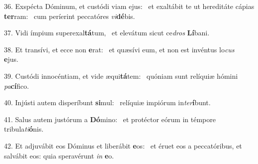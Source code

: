 36. Exspécta Dóminum, et custódi viam ejus: \dag\  et exaltábit te ut hereditáte cápias \textbf{ter}ram: \ast\  cum períerint peccatóres \textit{vi}\textbf{dé}bis.\

37. Vidi ímpium superexal\textbf{tá}tum, \ast\  et elevátum sicut ce\textit{dros} \textbf{Lí}bani.\

38. Et transívi, et ecce non \textbf{e}rat: \ast\  et quæsívi eum, et non est invéntus lo\textit{cus} \textbf{e}jus.\

39. Custódi innocéntiam, et vide æqui\textbf{tá}tem: \ast\  quóniam sunt relíquiæ hómini \textit{pa}\textbf{cí}fico.\

40. Injústi autem disperíbunt \textbf{si}mul: \ast\  relíquiæ impiórum in\textit{ter}\textbf{í}bunt.\

41. Salus autem justórum a \textbf{Dó}mino: \ast\  et protéctor eórum in témpore tribula\textit{ti}\textbf{ó}nis.\

42. Et adjuvábit eos Dóminus et liberábit \textbf{e}os: \ast\  et éruet eos a peccatóribus, et salvábit eos: quia speravérunt \textit{in} \textbf{e}o.\

